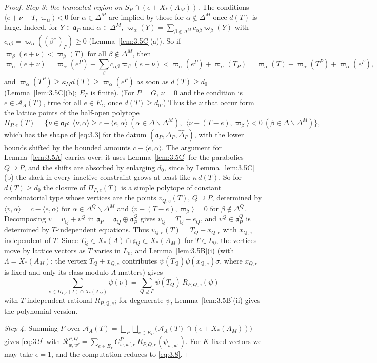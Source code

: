 \documentclass[12pt,letterpaper]{article}
\numberwithin{equation}{section}
\theoremstyle{plain}
\theoremstyle{remark}
\theoremstyle{plain}
\theoremstyle{definition}
\theoremstyle{remark}
\theoremstyle{remark}
\newcommand{\cA}{\mathcal{A}}
\newcommand{\fa}{\mathfrak{a}}
\newcommand{\ip}[1]{\langle #1\rangle}
\begin{document}
\begin{proof}
\emph{Step 3: the truncated region on $S_P\cap(e+X_*(A_M))$.} The conditions $\ip{e+\nu-T,\varpi_\alpha}<0$ for $\alpha\in\Delta^M$ are implied by those for $\alpha\notin\Delta^M$ once $d(T)$ is large. Indeed, for $Y\in\fa_P$ and $\alpha\in\Delta^M$, $\varpi_\alpha(Y)=\sum_{\beta\notin\Delta^M}c_{\alpha\beta}\varpi_\beta(Y)$ with $c_{\alpha\beta}=\varpi_\alpha((\beta^\vee)_P)\ge0$ (Lemma~\ref{lem:3.5C}(a)). So if $\varpi_\beta(e+\nu)<\varpi_\beta(T)$ for all $\beta\notin\Delta^M$, then
\[
\varpi_\alpha(e+\nu)=\varpi_\alpha(e^P)+\textstyle\sum_\beta c_{\alpha\beta}\varpi_\beta(e+\nu)<\varpi_\alpha(e^P)+\varpi_\alpha(T_P)=\varpi_\alpha(T)-\varpi_\alpha(T^P)+\varpi_\alpha(e^P),
\]
and $\varpi_\alpha(T^P)\ge\kappa_Md(T)\ge\varpi_\alpha(e^P)$ as soon as $d(T)\ge d_0$ (Lemma~\ref{lem:3.5C}(b); $E_P$ is finite). (For $P=G$, $\nu=0$ and the condition is $e\in\cA_A(T)$, true for all $e\in E_G$ once $d(T)\ge d_0$.) Thus the $\nu$ that occur form the lattice points of the half-open polytope
\[
\Pi_{P,e}(T)=\{\nu\in\fa_P:\ \ip{\nu,\alpha}\ge c-\ip{e,\alpha}\ (\alpha\in\Delta\smallsetminus\Delta^M),\ \ \ip{\nu-(T-e),\varpi_\beta}<0\ (\beta\in\Delta\smallsetminus\Delta^M)\},
\]
which has the shape of \eqref{eq:3.3} for the datum $(\fa_P,\Delta_P,\hat\Delta_P)$, with the lower bounds shifted by the bounded amounts $c-\ip{e,\alpha}$. The argument for Lemma~\ref{lem:3.5A} carries over: it uses Lemma~\ref{lem:3.5C} for the parabolics $Q\supseteq P$, and the shifts are absorbed by enlarging $d_0$, since by Lemma~\ref{lem:3.5C}(b) the slack in every inactive constraint grows at least like $\kappa\,d(T)$. So for $d(T)\ge d_0$ the closure of $\Pi_{P,e}(T)$ is a simple polytope of constant combinatorial type whose vertices are the points $v_{Q,e}(T)$, $Q\supseteq P$, determined by $\ip{v,\alpha}=c-\ip{e,\alpha}$ for $\alpha\in\Delta^Q\smallsetminus\Delta^M$ and $\ip{v-(T-e),\varpi_\beta}=0$ for $\beta\notin\Delta^Q$. Decomposing $v=v_Q+v^Q$ in $\fa_P=\fa_Q\oplus\fa_P^Q$ gives $v_Q=T_Q-e_Q$, and $v^Q\in\fa_P^Q$ is determined by $T$-independent equations. Thus $v_{Q,e}(T)=T_Q+x_{Q,e}$ with $x_{Q,e}$ independent of $T$. Since $T_Q\in X_*(A)\cap\fa_Q\subset X_*(A_M)$ for $T\in L_0$, the vertices move by lattice vectors as $T$ varies in $L_0$, and Lemma~\ref{lem:3.5B}(i) (with $\Lambda=X_*(A_M)$; the vertex $T_Q+x_{Q,e}$ contributes $\psi(T_Q)\psi(x_{Q,e})\sigma$, where $x_{Q,e}$ is fixed and only its class modulo $\Lambda$ matters) gives
\[
\sum_{\nu\in\Pi_{P,e}(T)\cap X_*(A_M)}\psi(\nu)=\sum_{Q\supseteq P}\psi(T_Q)\,R_{P,Q,e}(\psi)
\]
with $T$-independent rational $R_{P,Q,e}$; for degenerate $\psi$, Lemma~\ref{lem:3.5B}(ii) gives the polynomial version.

\emph{Step 4.} Summing $F$ over $\cA_A(T)=\bigsqcup_P\bigsqcup_{e\in E_P}\big(\cA_A(T)\cap(e+X_*(A_M))\big)$ gives \eqref{eq:3.9} with $\mathcal R^{P,Q}_{w,w'}=\sum_{e\in E_P}C^P_{w,w',e}\,R_{P,Q,e}(\psi_{w,w'})$. For $K$-fixed vectors we may take $\epsilon=1$, and the computation reduces to \eqref{eq:3.8}.
\end{proof}
\end{document}
